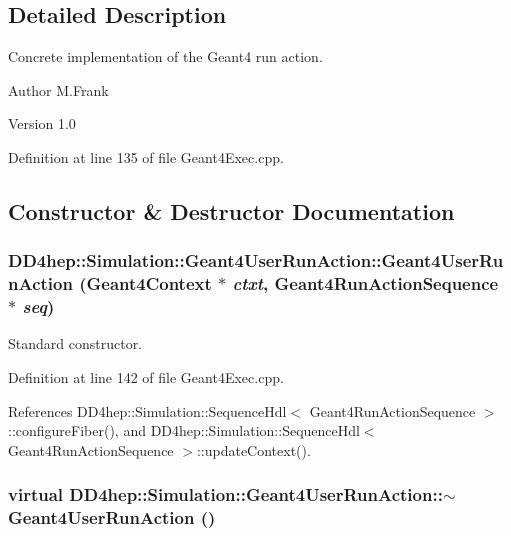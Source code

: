\subsection{Detailed Description}
Concrete implementation of the Geant4 run action. \begin{DoxyAuthor}{Author}
M.Frank 
\end{DoxyAuthor}
\begin{DoxyVersion}{Version}
1.0 
\end{DoxyVersion}


Definition at line 135 of file Geant4Exec.cpp.

\subsection{Constructor \& Destructor Documentation}
\hypertarget{class_d_d4hep_1_1_simulation_1_1_geant4_user_run_action_a4619583991588e3f0e3d51da6082bac3}{
\subsubsection[{Geant4UserRunAction}]{\setlength{\rightskip}{0pt plus 5cm}DD4hep::Simulation::Geant4UserRunAction::Geant4UserRunAction ({\bf Geant4Context} $\ast$ {\em ctxt}, \/  {\bf Geant4RunActionSequence} $\ast$ {\em seq})}}
\label{class_d_d4hep_1_1_simulation_1_1_geant4_user_run_action_a4619583991588e3f0e3d51da6082bac3}


Standard constructor. 

Definition at line 142 of file Geant4Exec.cpp.

References DD4hep::Simulation::SequenceHdl$<$ Geant4RunActionSequence $>$::configureFiber(), and DD4hep::Simulation::SequenceHdl$<$ Geant4RunActionSequence $>$::updateContext().\hypertarget{class_d_d4hep_1_1_simulation_1_1_geant4_user_run_action_a5b3bda44a46cc253d0c1d343d4f28738}{
\subsubsection[{$\sim$Geant4UserRunAction}]{\setlength{\rightskip}{0pt plus 5cm}virtual DD4hep::Simulation::Geant4UserRunAction::$\sim$Geant4UserRunAction ()}}
\label{class_d_d4hep_1_1_simulation_1_1_geant4_user_run_action_a5b3bda44a46cc253d0c1d343d4f28738}


